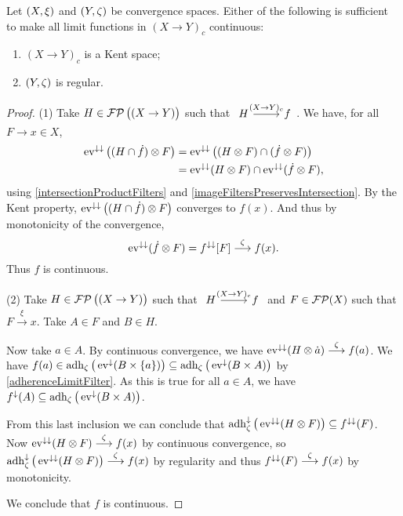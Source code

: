 \begin{proposition}
Let $\left( X,\xi \right)$ and $\left( Y,\zeta \right)$ be convergence spaces. Either of the following is sufficient to make all limit functions in $(X\to Y)_c$ continuous:
\begin{enumerate}
\item $(X\to Y)_c$ is a Kent space;
\item $\left( Y,\zeta \right)$ is regular. 
\end{enumerate}
\end{proposition}
\begin{proof}
(1) Take $H\in\operatorname{\mathcal{FP}}\big((X\to Y)\big)$ such that $\begin{tikzcd}H \arrow[r, "{(X\to Y)_c}"] & f\end{tikzcd}$. We have, for all $F\to x\in X$,
\begin{align*}
\operatorname{ev}^{\downarrow\downarrow}\big((H\cap \dot{f})\otimes F\big) &= \operatorname{ev}^{\downarrow\downarrow}\big((H \otimes F) \cap (\dot{f} \otimes F)\big) \\
&= \operatorname{ev}^{\downarrow\downarrow}(H \otimes F) \cap \operatorname{ev}^{\downarrow\downarrow}(\dot{f} \otimes F),
\end{align*} 
using \ref{intersectionProductFilters} and \ref{imageFiltersPreservesIntersection}. By the Kent property, $\operatorname{ev}^{\downarrow\downarrow}\big((H\cap \dot{f})\otimes F\big)$ converges to $f(x)$. And thus by monotonicity of the convergence,
\[ \operatorname{ev}^{\downarrow\downarrow}(\dot{f} \otimes F) = f^{\downarrow\downarrow}[F] \overset{\zeta}{\longrightarrow} f(x). \]
Thus $f$ is continuous.

(2) Take $H\in\operatorname{\mathcal{FP}}\big((X\to Y)\big)$ such that $\begin{tikzcd}H \arrow[r, "{(X\to Y)_c}"] & f\end{tikzcd}$ and $F\in\operatorname{\mathcal{FP}}(X)$ such that $F\overset{\xi}{\longrightarrow} x$. Take $A\in F$ and $B\in H$.

Now take $a\in A$. By continuous convergence, we have $\operatorname{ev}^{\downarrow\downarrow}(H\otimes\dot{a}) \overset{\zeta}{\longrightarrow} f(a)$. We have $f(a)\in\operatorname{adh}_\zeta\big(\operatorname{ev}^\downarrow(B\times\{a\})\big) \subseteq \operatorname{adh}_\zeta\big(\operatorname{ev}^\downarrow(B\times A)\big)$ by \ref{adherenceLimitFilter}. As this is true for all $a\in A$, we have $f^\downarrow(A) \subseteq \operatorname{adh}_\zeta\big(\operatorname{ev}^\downarrow(B\times A)\big)$.

From this last inclusion we can conclude that $\operatorname{adh}_\zeta^\downarrow\big(\operatorname{ev}^{\downarrow\downarrow}(H\otimes F)\big) \subseteq f^{\downarrow\downarrow}(F)$. Now $\operatorname{ev}^{\downarrow\downarrow}(H\otimes F)\overset{\zeta}{\longrightarrow} f(x)$ by continuous convergence, so $\operatorname{adh}_\zeta^\downarrow\big(\operatorname{ev}^{\downarrow\downarrow}(H\otimes F)\big)\overset{\zeta}{\longrightarrow} f(x)$ by regularity and thus $f^{\downarrow\downarrow}(F)\overset{\zeta}{\longrightarrow} f(x)$ by monotonicity.

We conclude that $f$ is continuous.
\end{proof}

